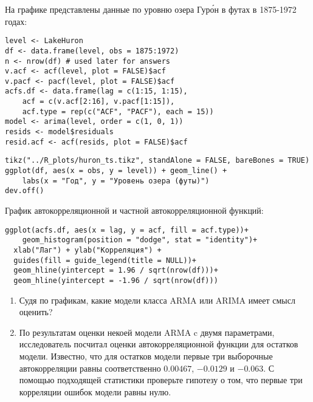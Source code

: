 \begin{problem}
На графике представлены данные по уровню озера Гур\'{о}н в футах в 1875-1972 годах:

\begin{verbatim}
level <- LakeHuron
df <- data.frame(level, obs = 1875:1972)
n <- nrow(df) # used later for answers
v.acf <- acf(level, plot = FALSE)$acf
v.pacf <- pacf(level, plot = FALSE)$acf
acfs.df <- data.frame(lag = c(1:15, 1:15),
    acf = c(v.acf[2:16], v.pacf[1:15]),
    acf.type = rep(c("ACF", "PACF"), each = 15))
model <- arima(level, order = c(1, 0, 1))
resids <- model$residuals
resid.acf <- acf(resids, plot = FALSE)$acf
\end{verbatim}



\begin{verbatim}
tikz("../R_plots/huron_ts.tikz", standAlone = FALSE, bareBones = TRUE)
ggplot(df, aes(x = obs, y = level)) + geom_line() +
    labs(x = "Год", y = "Уровень озера (футы)")
dev.off()
\end{verbatim}


%




График автокорреляционной и частной автокорреляционной функций:

\begin{verbatim}
ggplot(acfs.df, aes(x = lag, y = acf, fill = acf.type))+
    geom_histogram(position = "dodge", stat = "identity")+
  xlab("Лаг") + ylab("Корреляция") +
  guides(fill = guide_legend(title = NULL))+
  geom_hline(yintercept = 1.96 / sqrt(nrow(df)))+
  geom_hline(yintercept = -1.96 / sqrt(nrow(df)))
\end{verbatim}


\begin{enumerate}
\item Судя по графикам, какие модели класса ARMA или ARIMA имеет смысл оценить?
\item По результатам оценки некоей модели ARMA c двумя параметрами, исследователь посчитал оценки автокорреляционной функции для остатков модели. 
Известно, что для остатков модели первые три выборочные автокорреляции равны соответственно $0.00467$, $-0.0129$ и $-0.063$. 
С помощью подходящей статистики проверьте гипотезу о том, что первые три корреляции ошибок модели равны нулю.
\end{enumerate}



\end{problem}

